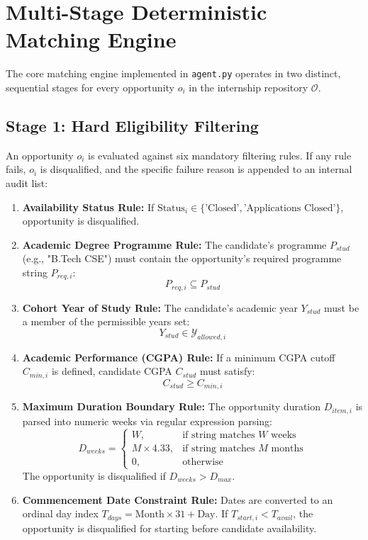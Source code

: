 \section{Multi-Stage Deterministic Matching Engine} \label{S4.2}
The core matching engine implemented in \texttt{agent.py} operates in two distinct, sequential stages for every opportunity $o_i$ in the internship repository $\mathcal{O}$.

\subsection{Stage 1: Hard Eligibility Filtering}
An opportunity $o_i$ is evaluated against six mandatory filtering rules. If any rule fails, $o_i$ is disqualified, and the specific failure reason is appended to an internal audit list:
\begin{enumerate}[label=\textbf{\arabic*.}]
	\item \textbf{Availability Status Rule:} If $\text{Status}_i \in \{\text{'Closed'}, \text{'Applications Closed'}\}$, opportunity is disqualified.
	\item \textbf{Academic Degree Programme Rule:} The candidate's programme $P_{stud}$ (e.g., "B.Tech CSE") must contain the opportunity's required programme string $P_{req,i}$:
	\begin{equation}
		P_{req,i} \subseteq P_{stud} \label{e4.1}
	\end{equation}
	\item \textbf{Cohort Year of Study Rule:} The candidate's academic year $Y_{stud}$ must be a member of the permissible years set:
	\begin{equation}
		Y_{stud} \in \mathcal{Y}_{allowed,i} \label{e4.2}
	\end{equation}
	\item \textbf{Academic Performance (CGPA) Rule:} If a minimum CGPA cutoff $C_{min,i}$ is defined, candidate CGPA $C_{stud}$ must satisfy:
	\begin{equation}
		C_{stud} \ge C_{min,i} \label{e4.3}
	\end{equation}
	\item \textbf{Maximum Duration Boundary Rule:} The opportunity duration $D_{item,i}$ is parsed into numeric weeks via regular expression parsing:
	\begin{equation}
		D_{weeks} = 
		\begin{cases}
			W, & \text{if string matches } W \text{ weeks} \\
			M \times 4.33, & \text{if string matches } M \text{ months} \\
			0, & \text{otherwise}
		\end{cases} \label{e4.4}
	\end{equation}
	The opportunity is disqualified if $D_{weeks} > D_{max}$.
	\item \textbf{Commencement Date Constraint Rule:} Dates are converted to an ordinal day index $T_{days} = \text{Month} \times 31 + \text{Day}$. If $T_{start,i} < T_{avail}$, the opportunity is disqualified for starting before candidate availability.
\end{enumerate}

